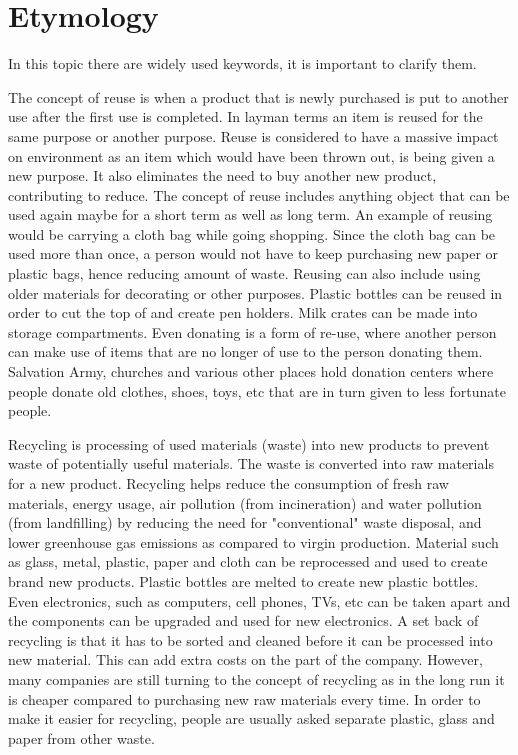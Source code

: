 \documentclass{article}
\begin{document}
\section{Etymology}
In this topic there are widely used keywords, it is important to clarify them.

The concept of reuse is when a product that is newly purchased is put to another use after the first use is completed. In layman terms an item is reused for the same purpose or another purpose. Reuse is considered to have a massive impact on environment as an item which would have been thrown out, is being given a new purpose. It also eliminates the need to buy another new product, contributing to reduce. The concept of reuse includes anything object that can be used again maybe for a short term as well as long term. An example of reusing would be carrying a cloth bag while going shopping. Since the cloth bag can be used more than once, a person would not have to keep purchasing new paper or plastic bags, hence reducing amount of waste. Reusing can also include using older materials for decorating or other purposes. Plastic bottles can be reused in order to cut the top of and create pen holders. Milk crates can be made into storage compartments. Even donating is a form of re-use, where another person can make use of items that are no longer of use to the person donating them. Salvation Army, churches and various other places hold donation centers where people donate old clothes, shoes, toys, etc that are in turn given to less fortunate people.

Recycling is processing of used materials (waste) into new products to prevent waste of potentially useful materials. The waste is converted into raw materials for a new product. Recycling helps reduce the consumption of fresh raw materials, energy usage, air pollution (from incineration) and water pollution (from landfilling) by reducing the need for "conventional" waste disposal, and lower greenhouse gas emissions as compared to virgin production. Material such as glass, metal, plastic, paper and cloth can be reprocessed and used to create brand new products. Plastic bottles are melted to create new plastic bottles. Even electronics, such as computers, cell phones, TVs, etc can be taken apart and the components can be upgraded and used for new electronics. A set back of recycling is that it has to be sorted and cleaned before it can be processed into new material. This can add extra costs on the part of the company. However, many companies are still turning to the concept of recycling as in the long run it is cheaper compared to purchasing new raw materials every time. In order to make it easier for recycling, people are usually asked separate plastic, glass and paper from other waste.
\end{document}
